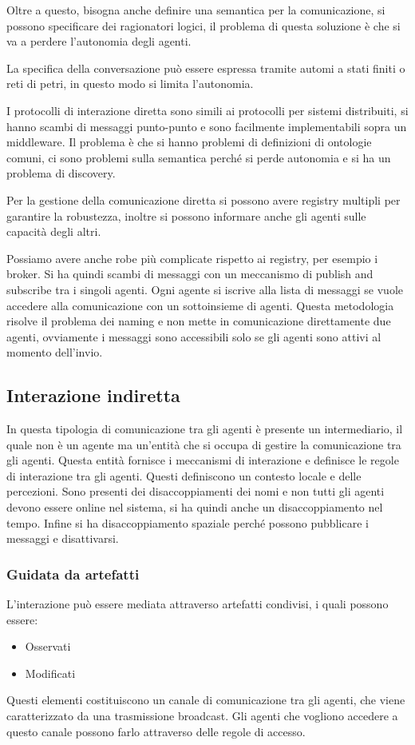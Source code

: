 Oltre a questo, bisogna anche definire una semantica per la comunicazione, si
possono specificare dei ragionatori logici, il problema di questa soluzione è
che si va a perdere l'autonomia degli agenti.

La specifica della conversazione può essere espressa tramite automi a stati finiti
o reti di petri, in questo modo si limita l'autonomia.

I protocolli di interazione diretta sono simili ai protocolli per sistemi distribuiti,
si hanno scambi di messaggi punto-punto e sono facilmente implementabili sopra
un middleware. Il problema è che si hanno problemi di definizioni di ontologie
comuni, ci sono problemi sulla semantica perché si perde autonomia e si ha un
problema di discovery.

Per la gestione della comunicazione diretta si possono avere registry multipli
per garantire la robustezza, inoltre si possono informare anche gli agenti sulle
capacità degli altri.

Possiamo avere anche robe più complicate rispetto ai registry, per esempio i broker.
Si ha quindi scambi di messaggi con un meccanismo di publish and subscribe tra
i singoli agenti. Ogni agente si iscrive alla lista di messaggi se vuole accedere
alla comunicazione con un sottoinsieme di agenti. Questa metodologia risolve il
problema dei naming e non mette in comunicazione direttamente due agenti,
ovviamente i messaggi sono accessibili solo se gli agenti sono attivi al momento
dell'invio.
\subsection{Interazione indiretta}
In questa tipologia di comunicazione tra gli agenti è presente un intermediario,
il quale non è un agente ma un'entità che si occupa di gestire la comunicazione
tra gli agenti. Questa entità fornisce i meccanismi di interazione e
definisce le regole di interazione tra gli agenti. Questi definiscono un
contesto locale e delle percezioni. Sono presenti dei disaccoppiamenti
dei nomi e non tutti gli agenti devono essere online nel sistema, si ha quindi
anche un disaccoppiamento nel tempo. Infine si ha disaccoppiamento spaziale
perché possono pubblicare i messaggi e disattivarsi.
\subsubsection{Guidata da artefatti}
L'interazione può essere mediata attraverso artefatti condivisi, i quali possono
essere:
\begin{itemize}
    \item Osservati
    \item Modificati
\end{itemize}
Questi elementi costituiscono un canale di comunicazione tra gli agenti, che
viene caratterizzato da una trasmissione broadcast. Gli agenti che vogliono
accedere a questo canale possono farlo attraverso delle regole di accesso.

